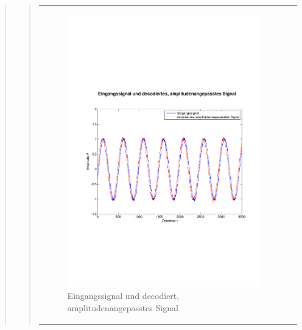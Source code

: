 \begin{quote}
\begin{quote}
\begin{center}
\begin{tabular}{ll}
            \hspace{-4cm}
                \begin{minipage}{0.6\textwidth}
                    \begin{figure}[H]
                        \includegraphics[scale=0.4, trim = 0.8cm 7cm 0.8cm
                        7.5cm, clip]
                        {./Bilder/sin100_Eingang_vs_DecodiertAmpl-angepasst}
                          \caption{Eingangssignal und decodiert,
                          amplitudenangepasstes Signal}
                    \end{figure}
                \end{minipage}
                

\end{tabular}
\end{center}
\end{quote}
\end{quote}
